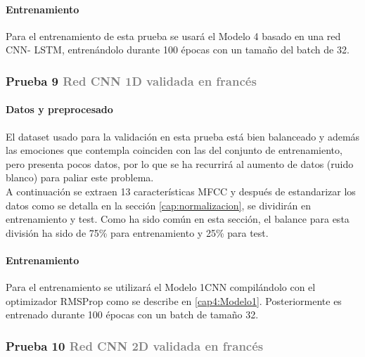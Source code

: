 \documentclass[11pt,a4paper,spanish]{book}
\begin{document}
		\paragraph{Entrenamiento} Para el entrenamiento de esta prueba se usará el Modelo 4 basado en una red CNN- LSTM, entrenándolo durante 100 épocas con un tamaño del batch de 32.	




	\subsubsection{\large Prueba 9 {\normalsize \textcolor{Gray}{Red CNN 1D validada en francés}}}
	
	\setlength{\leftskip}{1cm}	
		\paragraph{Datos y preprocesado} El dataset usado para la validación en esta prueba está bien balanceado y además las emociones que contempla coinciden con las del conjunto de entrenamiento, pero presenta pocos datos, por lo que se ha recurrirá al aumento de datos (ruido blanco) para paliar este problema.\\
		A continuación se extraen 13 características MFCC y después de estandarizar los datos como se detalla en la sección \ref{cap:normalizacion}, se dividirán en entrenamiento y test. Como ha sido común en esta sección, el balance para esta división ha sido de 75\% para entrenamiento y 25\% para test.\\
		
		\paragraph{Entrenamiento}  Para el entrenamiento se utilizará el Modelo 1CNN compilándolo con el optimizador RMSProp como se describe en \ref{cap4:Modelo1}. Posteriormente es entrenado durante 100 épocas con un batch de tamaño 32.
		

	\subsubsection{\large Prueba 10 {\normalsize \textcolor{Gray}{Red CNN 2D validada en francés}}}
\end{document}
